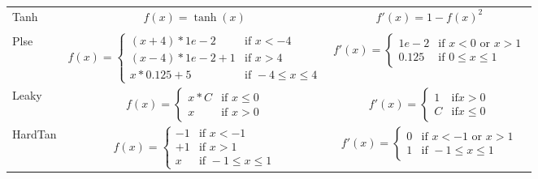 \begin{table*}
\begin{adjustbox}{max width=\textwidth}
\begin{tabular}{lcc}
Tanh     &  $f(x) = \tanh(x)$                       &  $f'(x) = 1 - f(x)^2$  \\     \\                                                                               

Plse     &  $f(x) = \left\{\begin{array}{rl}
                            (x + 4) * 1e-2 & \mbox{if }     x<-4\\
                            (x - 4) * 1e-2 + 1 & \mbox{if } x>4\\
                            x * 0.125 + 5 & \mbox{if }     -4\leq x \leq 4
                           \end{array}\right.$
                                                    &  $f'(x) = \left\{\begin{array}{rl} 1e-2 & \mbox{if } x<0 \mbox{ or } x>1\\ 0.125 & \mbox{if } 0\leq x \leq 1  \end{array}\right.$ \\                                                                                         

Leaky    &  $f(x) = \left\{\begin{array}{rl} 
                            x * C &  \mbox{if } x\leq0\\
                            x     &  \mbox{if } x>0
                           \end{array}\right.$                                 
                                                    &  $f'(x) = \left\{\begin{array}{rl} 1   & \mbox{if} x>0   \\ C   & \mbox{if} x\leq0 \end{array}\right.$ \\

HardTan  &  $f(x) = \left\{\begin{array}{rl}
                            -1 & \mbox{if }     x<-1\\
                            +1 & \mbox{if }     x>1\\
                             x & \mbox{if } -1\leq x \leq 1
                           \end{array}\right.$                              
                                                    &  $f'(x) = \left\{\begin{array}{rl}
                                                                        0 & \mbox{if } x<-1 \mbox{ or } x>1\\
                                                                        1 & \mbox{if } -1\leq x \leq 1
                                                                       \end{array}\right.$                                                                          \\


\end{tabular}
\end{adjustbox}
\end{table*}
